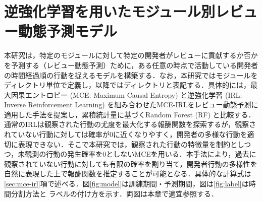 \documentclass[submit,noauthor,ses,dvipdfmx]{ipsj}
\newcommand{\todo}[1]{\colorbox{yellow}{{\bf TODO}:}{\color{red} {\textbf{[#1]}}}}
\begin{document}




\section{逆強化学習を用いたモジュール別レビュー動態予測モデル}\label{sec:model}

本研究は，特定のモジュールに対して特定の開発者がレビューに貢献するか否かを予測する（レビュー動態予測）ために，ある任意の時点で活動している開発者の時間経過順の行動を捉えるモデルを構築する．なお，本研究ではモジュールをディレクトリ単位で定義し，以降ではディレクトリと表記する．具体的には，最大因果エントロピー (MCE: Maximum Causal Entropy) と逆強化学習 (IRL: Inverse Reinforcement Learning) を組み合わせたMCE-IRLをレビュー動態予測に適用した手法を提案し，累積統計量に基づくRandom Forest (RF) と比較する．通常のIRLは観察された行動の尤度を最大化する報酬関数を探索するが，観察されていない行動に対しては確率が0に近くなりやすく，開発者の多様な行動を適切に表現できない．そこで本研究では，観察された行動の特徴量を制約としつつ，未観測の行動の発生確率を0としないMCEを用いる．本手法により，過去に観察されていない行動に対しても有限の確率を割り当て，開発者行動の多様性を自然に表現した上で報酬関数を推定することが可能となる．具体的な計算式は\ref{sec:mce-irl}項で述べる．図\ref{fig:model}は訓練期間・予測期間，図は\ref{fig:label}は時間分割方法と
ラベルの付け方を示す．両図は本章で適宜参照する．


\end{document}
